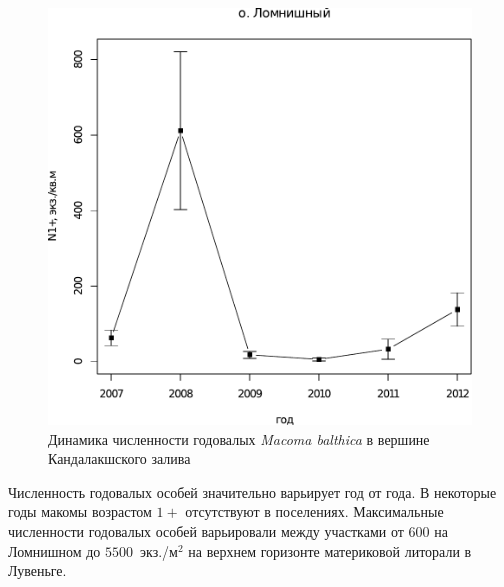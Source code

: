 \begin{figure}[p]
\begin{minipage}[b]{.49\linewidth}
\begin{center}
		\includegraphics[width=\linewidth]{../White_Sea/Lomnishniy/Lomnishniy_N_oneyear1.pdf}
	\end{center}
	\end{minipage}

	\caption{Динамика численности годовалых {\it Macoma balthica} в вершине Кандалакшского залива}
	\label{ris:dynamic_1year_Kandalaksha}
	\end{figure}
Численность годовалых особей значительно варьирует год от года. 
В некоторые годы макомы возрастом $1+$ отсутствуют в поселениях.
Максимальные численности годовалых особей варьировали между участками от $600$ на Ломнишном до $5500$~экз./м$^2$ на верхнем горизонте материковой литорали в Лувеньге.

